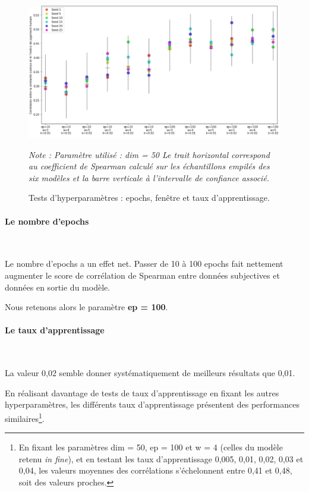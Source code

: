 \documentclass[11pt,french,french]{article}
\let\rmarkdownfootnote\footnote%
\def\footnote{\protect\rmarkdownfootnote}
\begin{document}
\begin{figure}[htp]
\begin{center}
\includegraphics[width=1\textwidth]{img/test_parametres.png}
\captionsetup{margin=0cm,format=hang,justification=justified}
\caption{Tests d'hyperparamètres : epochs, fenêtre et taux d'apprentissage.}\label{fig:evaluation_1}
\end{center}
\vspace{-0.3cm}
\footnotesize
\emph{Note : Paramètre utilisé : dim = 50\newline
Le trait horizontal correspond au coefficient de Spearman calculé sur les échantillons empilés des six modèles et la barre verticale à l'intervalle de confiance associé.}
\end{figure}

\paragraph{Le nombre d'epochs}\label{le-nombre-depochs}

~

Le nombre d'epochs a un effet net. Passer de 10 à 100 epochs fait
nettement augmenter le score de corrélation de Spearman entre données
subjectives et données en sortie du modèle.

\faArrowCircleRight{} Nous retenons alors le paramètre \textbf{ep =
100}.

\paragraph{Le taux d'apprentissage}\label{le-taux-dapprentissage}

~

La valeur 0,02 semble donner systématiquement de meilleurs résultats que
0,01.

En réalisant davantage de tests de taux d'apprentissage en fixant les
autres hyperparamètres, les différents taux d'apprentissage présentent
des performances similaires\footnote{En fixant les paramètres dim = 50,
  ep = 100 et w = 4 (celles du modèle retenu \emph{in fine}), et en
  testant les taux d'apprentissage 0,005, 0,01, 0,02, 0,03 et 0,04, les
  valeurs moyennes des corrélations s'échelonnent entre 0,41 et 0,48,
  soit des valeurs proches.}.
\end{document}
